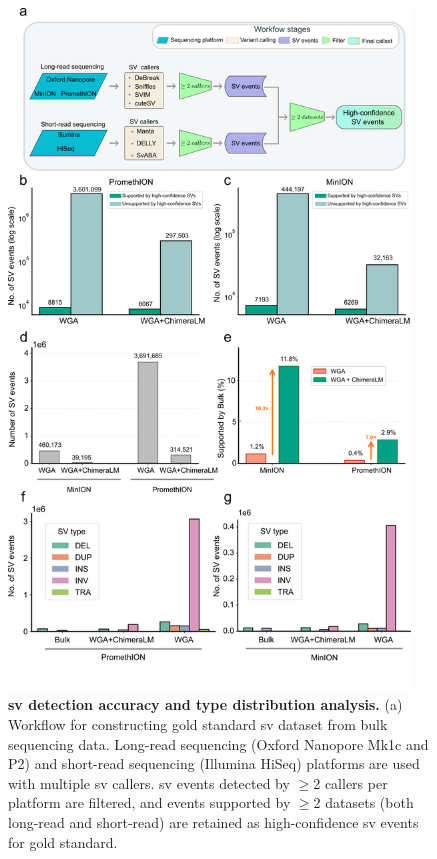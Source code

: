 \documentclass[pdflatex,sn-nature]{sn-jnl}%
\theoremstyle{thmstyleone}%
\theoremstyle{thmstyletwo}%
\theoremstyle{thmstylethree}%
\begin{document}
\begin{figure}[!ht]
	\begin{center}
		\includegraphics[width=0.95\textwidth]{final_figures/figure3}
	\end{center}
	\caption{{\bf \gls{sv} detection accuracy and type distribution analysis.}
		(a) Workflow for constructing gold standard \gls{sv} dataset from bulk sequencing data. Long-read sequencing (Oxford Nanopore Mk1c and P2) and short-read sequencing (Illumina HiSeq) platforms are used with multiple \gls{sv} callers. \gls{sv} events detected by $\geq$2 callers per platform are filtered, and events supported by $\geq$2 datasets (both long-read and short-read) are retained as high-confidence \gls{sv} events for gold standard.
}
\end{figure}
\end{document}
